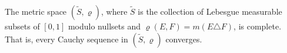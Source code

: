 The metric space $(\tilde{S}, \varrho)$, where $\tilde{S}$ is the collection of Lebesgue measurable subsets of $[0,1]$ modulo nullsets and $\varrho(E, F) = m(E \triangle F)$, is complete. That is, every Cauchy sequence in $(\tilde{S}, \varrho)$ converges.
